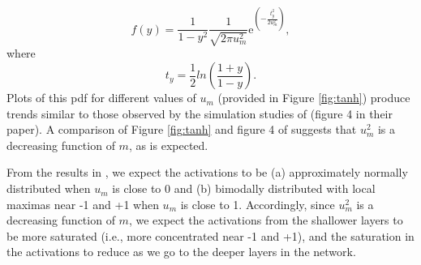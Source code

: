 \documentclass[a4paper]{article}
\newcommand{\enum}[1]{\label{eq:#1}}
\newcommand{\be}{\begin{equation}}
\newcommand{\ee}{\end{equation}}
\begin{document}
\be 
f(y) = \frac{1}{1-y^{2}}\frac{1}{\sqrt{2\pi u_{m}^{2}}}\mbox{e}^{\left({-\frac{t_{y}^{2}}{2u_{m}^{2}}}\right)} \enum{tanh1},
\ee
where 
\be 
t_{y} =  \frac{1}{2} ln\left(\frac{1+y}{1-y}\right).
\ee
Plots of this pdf for different values of $u_{m}$  (provided in Figure \ref{fig:tanh}) produce trends similar to those observed by the simulation studies of \cite{glorot2010understanding} (figure 4 in their paper). A comparison of Figure \ref{fig:tanh} and figure 4 of \cite{glorot2010understanding}  suggests that $u_{m}^{2}$ is a decreasing function of $m$, as is expected.

From the results in \cite{godfrey2009tanh}, we expect the  activations to be (a) approximately normally distributed when $u_{m}$ is close to 0 and (b) bimodally distributed with local maximas near -1 and +1 when $u_{m}$ is close to 1. Accordingly, since $u_{m}^{2}$ is a decreasing function of $m$, we expect the activations from the shallower layers to be more saturated (i.e., more concentrated near -1 and +1), and the saturation in the activations to reduce as we go to the deeper layers in the network. 











\end{document}
